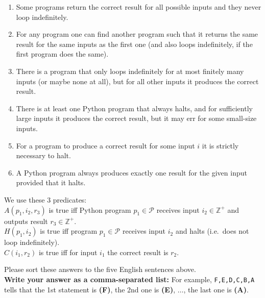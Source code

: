 \documentclass[jou]{apa6}
\begin{document}
\begin{enumerate}
\item Some programs return the correct result for all possible inputs and 
they never loop indefinitely.
\item For any program one can find another program such that it returns
the same result for the same inputs as the first one (and also loops indefinitely, 
if the first program does the same).
\item There is a program that only loops indefinitely for at most finitely many inputs (or maybe none at all), 
but for all other inputs it produces the correct result.
\item There is at least one Python program that always halts, and for sufficiently large inputs it produces
the correct result, but it may err for some small-size inputs.
\item For a program to produce a correct result for some input $i$ it is strictly necessary to halt.\\
\item A Python program always produces exactly one result for the given input provided that it halts.
\end{enumerate}

We use these $3$ predicates:\\
$A(p_1,i_2,r_3)$ is true iff
Python program $p_1 \in \mathcal{P}$ receives input $i_2 \in \mathbb{Z}^{+}$ and outputs 
result $r_3 \in \mathbb{Z}^{+}$.\\
$H(p_1,i_2)$ is true iff program $p_1 \in \mathcal{P}$ receives input $i_2$ and halts (i.e.\ does not
loop indefinitely).\\
$C(i_1,r_2)$ is true iff for input $i_1$ the correct result is $r_2$. 

Please sort these answers to the five English sentences above.\\
{\bf Write your answer as a comma-separated list:} For example, 
{\tt F,E,D,C,B,A} tells that the 1st statement is {\bf (F)}, the 2nd one
is {\bf (E)}, $\ldots$, the 
last one is {\bf (A)}.
\end{document}
